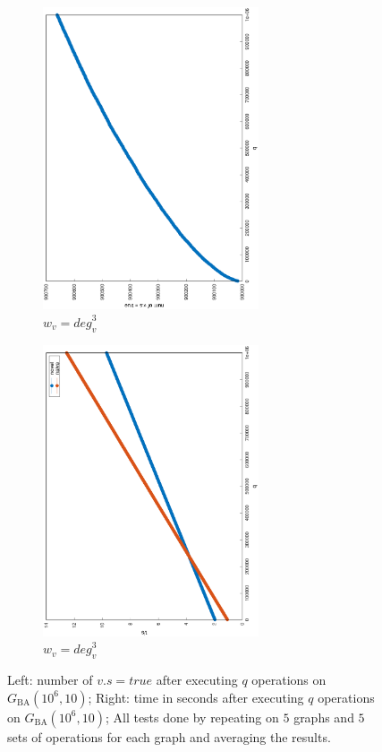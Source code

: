 \documentclass[12pt]{report}
\begin{document}
\begin{figure}
\begin{subfigure}{0.35\textwidth}
	\includegraphics[width=0.7\textwidth,angle=-90]{graph/ba_coverage_1000000_10_0.1_power_3.eps}
	\caption{$ w_v = \mathit{deg}_v^3 $}
\end{subfigure}
\begin{subfigure}{0.35\textwidth}
	\includegraphics[width=0.7\textwidth,angle=-90]{graph/ba_q_1000000_10_0.1_power_3.eps}
	\caption{$ w_v = \mathit{deg}_v^3 $}
\end{subfigure}
	\caption{Left: number of $ v.s = \textit{true} $ after executing $ q $ operations on $ G_\mathrm{BA}(10^6, 10) $;
	         Right: time in seconds after executing $ q $ operations on $ G_\mathrm{BA}(10^6, 10) $;
			 All tests done by repeating on $ 5 $ graphs and $ 5 $ sets of operations for each graph and averaging the results.}
\end{figure}
\end{document}
